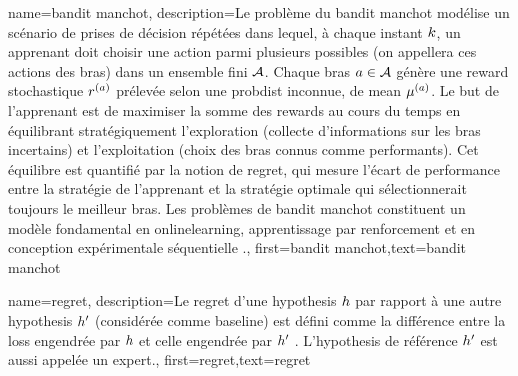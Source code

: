 
{
	name={bandit manchot},
	description={Le problème du bandit manchot modélise un scénario 
		de prises de décision répétées dans lequel, à chaque instant $k$, un apprenant doit 
		choisir une action parmi plusieurs possibles (on appellera ces actions des bras) dans un ensemble fini $\mathcal{A}$. 
		Chaque bras $a \in \mathcal{A}$ génère une \gls{reward} stochastique $r^{(a)}$ 
		prélevée selon une \gls{probdist} inconnue, de \gls{mean} $\mu^{(a)}$. 
		Le but de l’apprenant est de maximiser la somme des \glspl{reward} au cours du temps en équilibrant 
		stratégiquement l’exploration (collecte d’informations sur les bras incertains) et 
		l’exploitation (choix des bras connus comme performants). 
		Cet équilibre est quantifié par la notion de \gls{regret}, qui mesure l’écart de performance 
		entre la stratégie de l’apprenant et la stratégie optimale qui sélectionnerait toujours le meilleur bras. 
		Les problèmes de bandit manchot constituent un modèle fondamental en \gls{onlinelearning}, 
		apprentissage par renforcement et en conception expérimentale séquentielle \cite{Bubeck2012}.},
	first={bandit manchot},text={bandit manchot}
}

{	name={regret},
	description={Le regret d’une \gls{hypothesis} $h$ par rapport à 
		une autre \gls{hypothesis} $h'$ (considérée comme \gls{baseline}) 
		est défini comme la différence entre la \gls{loss} engendrée par $h$ 
		et celle engendrée par $h'$ \cite{PredictionLearningGames}. 
		L'\gls{hypothesis} de référence $h'$ est aussi appelée un \gls{expert}.},
	first={regret},text={regret}
}

